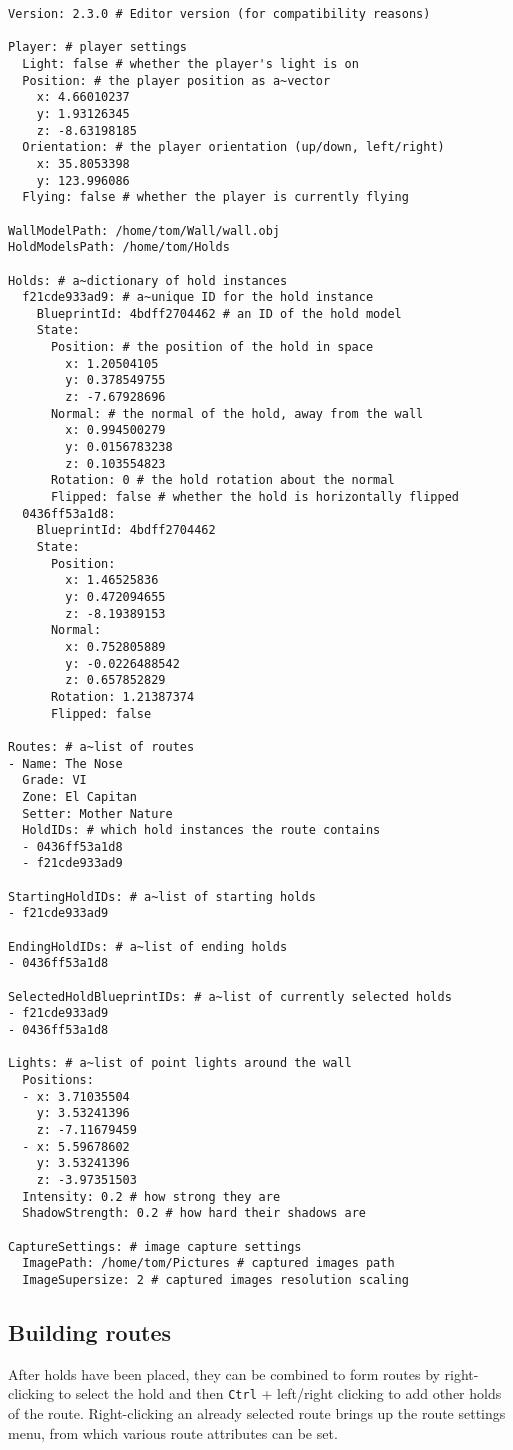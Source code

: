 \begin{verbatim}
Version: 2.3.0 # Editor version (for compatibility reasons)

Player: # player settings
  Light: false # whether the player's light is on
  Position: # the player position as a~vector
    x: 4.66010237
    y: 1.93126345
    z: -8.63198185
  Orientation: # the player orientation (up/down, left/right)
    x: 35.8053398
    y: 123.996086
  Flying: false # whether the player is currently flying

WallModelPath: /home/tom/Wall/wall.obj
HoldModelsPath: /home/tom/Holds

Holds: # a~dictionary of hold instances
  f21cde933ad9: # a~unique ID for the hold instance
    BlueprintId: 4bdff2704462 # an ID of the hold model
    State:
      Position: # the position of the hold in space
        x: 1.20504105
        y: 0.378549755
        z: -7.67928696
      Normal: # the normal of the hold, away from the wall
        x: 0.994500279
        y: 0.0156783238
        z: 0.103554823
      Rotation: 0 # the hold rotation about the normal
      Flipped: false # whether the hold is horizontally flipped
  0436ff53a1d8:
    BlueprintId: 4bdff2704462
    State:
      Position:
        x: 1.46525836
        y: 0.472094655
        z: -8.19389153
      Normal:
        x: 0.752805889
        y: -0.0226488542
        z: 0.657852829
      Rotation: 1.21387374
      Flipped: false

Routes: # a~list of routes
- Name: The Nose
  Grade: VI
  Zone: El Capitan
  Setter: Mother Nature
  HoldIDs: # which hold instances the route contains
  - 0436ff53a1d8
  - f21cde933ad9

StartingHoldIDs: # a~list of starting holds
- f21cde933ad9

EndingHoldIDs: # a~list of ending holds
- 0436ff53a1d8

SelectedHoldBlueprintIDs: # a~list of currently selected holds
- f21cde933ad9
- 0436ff53a1d8

Lights: # a~list of point lights around the wall
  Positions:
  - x: 3.71035504
    y: 3.53241396
    z: -7.11679459
  - x: 5.59678602
    y: 3.53241396
    z: -3.97351503
  Intensity: 0.2 # how strong they are
  ShadowStrength: 0.2 # how hard their shadows are

CaptureSettings: # image capture settings
  ImagePath: /home/tom/Pictures # captured images path
  ImageSupersize: 2 # captured images resolution scaling
\end{verbatim}

\subsection{Building routes}
After holds have been placed, they can be combined to form routes by right-clicking to select the hold and then \verb|Ctrl| + left/right clicking to add other holds of the route.
Right-clicking an already selected route brings up the route settings menu, from which various route attributes can be set.

